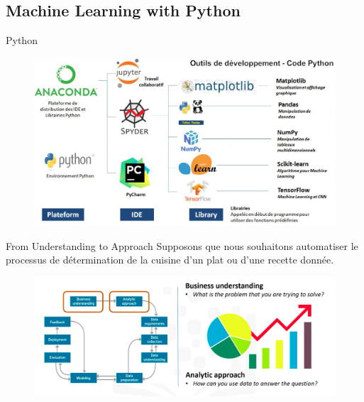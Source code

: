 \documentclass{beamer}
\begin{document}
\subsection{Machine Learning with Python}
\begin{frame}{Python}
	\begin{figure}
		\includegraphics[width=\textwidth]{PythonIDE.jpg}
	\end{figure}
\end{frame}


\begin{frame}{From Understanding to Approach}
		Supposons que nous souhaitons automatiser le processus de détermination de la cuisine d'un plat ou d'une recette donnée. 
	\begin{figure}
		\includegraphics[width=\textwidth]{From Understanding to Approach.png}
	\end{figure}
\end{frame}
\end{document}
